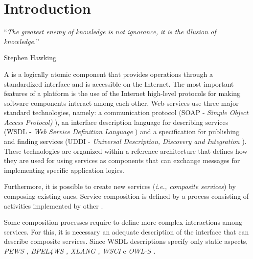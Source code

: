 \chapter{Introduction}
\label{chapter:introduction} 

\epigraph{``\textit{The greatest enemy of knowledge is not ignorance, it is the illusion of
knowledge.}''}{Stephen Hawking}
 
\bigskip 
\bigskip
 
A  is a logically atomic component that provides
operations through a standardized interface and is accessible on the Internet. The most important
features of a  platform is the use of the Internet
high-level protocols for making software components interact among each other.
Web services use three major standard technologies, namely: a communication
protocol (SOAP - \textit{Simple Object Access Protocol)} \cite{soap}), an interface
description language for describing services (WSDL - \textit{Web Service
Definition Language} \cite{wsdl}) and a specification for publishing and finding
services (UDDI - \textit{Universal Description, Discovery and Integration}
\cite{uddi}). These technologies are organized within a reference architecture
that defines how they are used for using services as components that can
exchange messages for implementing 	specific application logics.
 

 
Furthermore, it is possible to create new services (\textit{i.e., composite
services}) by composing existing ones. Service composition is defined by a
process consisting of activities implemented by other .

   

Some composition processes require to define more complex
interactions among services. For this, it is necessary an adequate description
of the interface that can describe composite services. Since WSDL descriptions
specify only static aspects,   \textit{PEWS
\cite{BaCAM05}, BPEL4WS \cite{bpel03}, XLANG \cite{xlang}, WSCI \cite{wsci}} e \textit{OWL-S \cite{owl04}}. 

